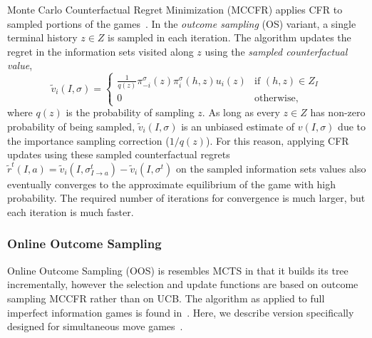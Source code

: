 Monte Carlo Counterfactual Regret Minimization (MCCFR) applies CFR to sampled portions of the games~\cite{Lanctot09Sampling}.
In the {\it outcome sampling} (OS) variant, a single terminal history $z\in Z$ is sampled in each iteration.
The algorithm updates the regret in the information sets visited along $z$ using the
{\it sampled counterfactual value},
\begin{equation}
\tilde{v}_i(I,\sigma) = \left\{
\begin{array}{ll}
\frac{1}{q(z)} \pi^{\sigma}_{-i}(z) \pi^{\sigma}_{i}(h,z) u_i(z) & \mbox{if } (h,z) \in Z_I\\
0  & \mbox{otherwise,}
\end{array} \right.
\label{eq:scv}
\end{equation}
where $q(z)$ is the probability of sampling $z$.
As long as every $z \in Z$ has non-zero probability of being sampled, $\tilde{v}_i(I,\sigma)$ is an unbiased estimate of $v(I,\sigma)$
due to the importance sampling correction ($1/q(z)$). For this reason, applying CFR updates using these sampled counterfactual regrets
$\tilde{r}^t(I,a) = \tilde{v}_i(I,\sigma^t_{I \rightarrow a}) - \tilde{v}_i(I,\sigma^t)$
on the sampled information sets values also eventually converges to the approximate equilibrium of the game with high probability.
The required number of iterations for convergence is much larger, but each iteration is much faster.



\subsubsection{Online Outcome Sampling} \label{sec:oos}

Online Outcome Sampling (OOS) is resembles MCTS in that it builds its tree incrementally, however the selection 
and update functions are based on outcome sampling MCCFR rather than on UCB. The algorithm as applied to full 
imperfect information games is found in~\cite{Lanctot14OOS}. Here, we describe version specifically 
designed for simultaneous move games~\cite{Lanctot13Goofspiel}. 

